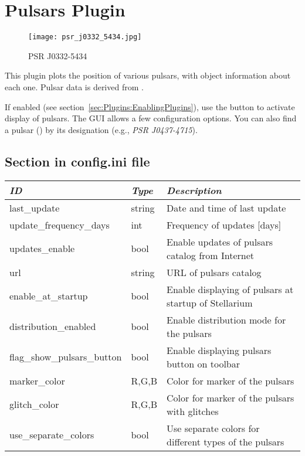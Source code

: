 \newpage

\section{Pulsars Plugin}
\label{sec:plugins:Pulsars}

\begin{figure}[ht]
\texttt{[image: psr\_j0332\_5434.jpg]}
\caption{PSR J0332-5434}
\label{fig:plugin:Pulsars}
\end{figure}

\noindent This plugin plots the position of various pulsars, with object
information about each one. Pulsar data is derived from .

If enabled (see section~\ref{sec:Plugins:EnablingPlugins}), use the
 button to activate display of
pulsars. The GUI allows a few configuration options.  You can also
find a pulsar () by its designation (e.g., \emph{PSR
  J0437-4715}).



\subsection{Section  in config.ini file}

\begin{tabularx}{\textwidth}{l|l|X}\toprule
\emph{ID}               & \emph{Type} & \emph{Description}\\\midrule
last\_update                & string & Date and time of last update\\%
update\_frequency\_days     & int    & Frequency of updates [days]\\%
updates\_enable             & bool   & Enable updates of pulsars catalog from Internet \\%
url                         & string & URL of pulsars catalog \\%
enable\_at\_startup         & bool   & Enable displaying of pulsars at startup of Stellarium \\%
distribution\_enabled       & bool   & Enable distribution mode for the pulsars \\%
flag\_show\_pulsars\_button & bool   & Enable displaying pulsars button on toolbar \\%
marker\_color               & R,G,B  & Color for marker of the pulsars \\%
glitch\_color               & R,G,B  & Color for marker of the pulsars with glitches \\%
use\_separate\_colors       & bool   & Use separate colors for different types of the pulsars \\\bottomrule
\end{tabularx}

